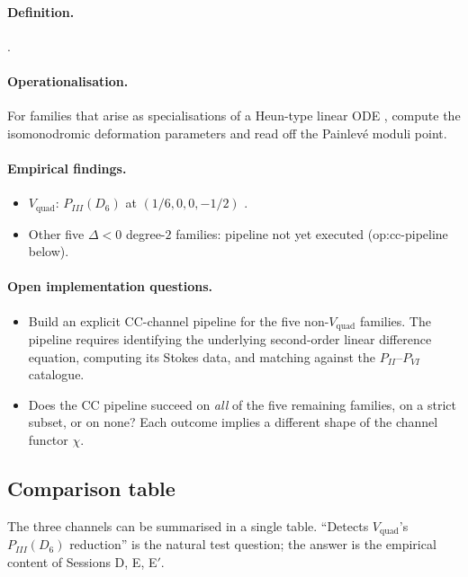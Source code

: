 \documentclass[11pt,reqno]{amsart}
\theoremstyle{plain}
\theoremstyle{definition}
\theoremstyle{remark}
\newcommand{\CC}{\mathrm{CC}}
\newcommand{\Vquad}{V_{\mathrm{quad}}}
\begin{document}
\paragraph{Definition.} .

\paragraph{Operationalisation.} For families that arise as
specialisations of a Heun-type linear ODE
\cite{slavyanov2000special}, compute the isomonodromic
deformation parameters and read off the Painlev\'e moduli
point.

\paragraph{Empirical findings.}
\begin{itemize}
\item $\Vquad$: $P_{III}(D_6)$ at $(1/6, 0, 0, -1/2)$
\cite{iwasaki1991from, ohyama2006studies}.
\item Other five $\Delta<0$ degree-$2$ families: pipeline
not yet executed (op:cc-pipeline below).
\end{itemize}

\paragraph{Open implementation questions.}
\begin{itemize}
\item Build an explicit $\CC$-channel pipeline for the five
non-$\Vquad$ families. The pipeline requires identifying
the underlying second-order linear difference equation,
computing its Stokes data, and matching against the
$P_{II}$--$P_{VI}$ catalogue.
\item Does the $\CC$ pipeline succeed on \emph{all} of the
five remaining families, on a strict subset, or on none?
Each outcome implies a different shape of the channel
functor $\chi$.
\end{itemize}

\subsection{Comparison table}
\label{ssec:comparison}

The three channels can be summarised in a single table.
``Detects $\Vquad$'s $P_{III}(D_6)$ reduction'' is the
natural test question; the answer is the empirical content
of Sessions D, E, E$'$.
\end{document}
